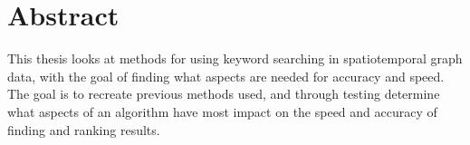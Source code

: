 \section*{Abstract}
This thesis looks at methods for using keyword searching in spatiotemporal graph data, with the goal of finding what aspects are needed for accuracy and speed. The goal is to recreate previous methods used, and through testing determine what aspects of an algorithm have most impact on the speed and accuracy of finding and ranking results.
